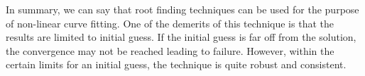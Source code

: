 \documentclass{article}
\begin{document}
\clearpage

In summary, we can say that root finding techniques can be used for the purpose of non-linear curve fitting. One of the demerits of this technique is that the results are limited to initial guess. If the initial guess is far off from the solution, the convergence may not be reached leading to failure. However, within the certain limits for an initial guess, the technique is quite robust and consistent.
\end{document}
